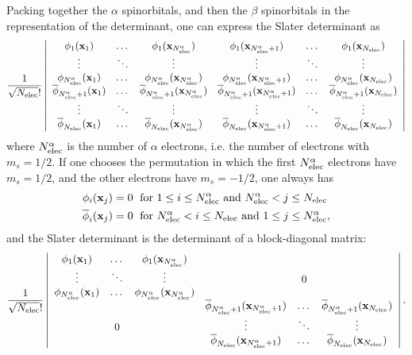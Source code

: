 \documentclass[./thesis.tex]{subfiles}
\begin{document}
Packing together the $\alpha$ spinorbitals, and then the $\beta$ spinorbitals in the representation of
the determinant, one can express the Slater determinant as
\begin{equation}
\frac{1}{\sqrt{{N_\text{elec}}}!} \left|
 \begin{array}{cccccc}
 \phi_1({\bf x}_1)  & \dots & \phi_1({\bf x}_{{N_\text{elec}^\alpha}}) & \phi_1({\bf x}_{{N_\text{elec}^\alpha}+1}) & \dots & \phi_1({\bf x}_{{N_\text{elec}}}) \\
 \vdots             & \ddots& \vdots                    & \vdots                      &\ddots & \vdots  \\         
 \phi_{{N_\text{elec}^\alpha}}({\bf x}_1)  & \dots & \phi_{{N_\text{elec}^\alpha}}({\bf x}_{{N_\text{elec}^\alpha}}) & \phi_{{N_\text{elec}^\alpha}}({\bf x}_{{N_\text{elec}^\alpha}+1}) & \dots & \phi_{{N_\text{elec}^\alpha}}({\bf x}_{{N_\text{elec}}}) \\
 \overline{\phi}_{{N_\text{elec}^\alpha}+1}({\bf x}_1)  & \dots & \overline{\phi}_{{N_\text{elec}^\alpha}+1}({\bf x}_{{N_\text{elec}^\alpha}}) & \overline{\phi}_{{N_\text{elec}^\alpha}+1}({\bf x}_{{N_\text{elec}^\alpha}+1}) & \dots & \overline{\phi}_{{N_\text{elec}^\alpha}+1}({\bf x}_{{N_\text{elec}}}) \\
 \vdots             & \ddots& \vdots                    & \vdots                      &\ddots & \vdots  \\         
 \overline{\phi}_{{N_\text{elec}}}({\bf x}_1)  & \dots & \overline{\phi}_{{N_\text{elec}}}({\bf x}_{{N_\text{elec}^\alpha}}) & \overline{\phi}_{{N_\text{elec}}}({\bf x}_{{N_\text{elec}^\alpha}+1}) & \dots & \overline{\phi}_{{N_\text{elec}}}({\bf x}_{{N_\text{elec}}}) \\
 \end{array}
\right| 
\end{equation}
where ${N_\text{elec}^\alpha}$ is the number of $\alpha$ electrons, i.e. the number of electrons with $m_s=1/2$.
If one chooses the permutation in which the first ${N_\text{elec}^\alpha}$ electrons have $m_s=1/2$, and the other electrons have $m_s=-1/2$, one always has
\begin{align}
\phi_i(\mathbf{x}_j) & = 0 \; \text{ for } 1 \le i \le {N_\text{elec}^\alpha} \text{ and } {N_\text{elec}^\alpha} < j \le {N_\text{elec}} \\ \nonumber
\overline{\phi}_i(\mathbf{x}_j) & = 0 \; \text{ for }  {N_\text{elec}^\alpha} < i \le {N_\text{elec}} \text{ and }  1 \le j \le {N_\text{elec}^\alpha},
\end{align}
and the Slater determinant is the determinant of a block-diagonal matrix:
\begin{equation}
\frac{1}{\sqrt{{N_\text{elec}}}!} \left|
 \begin{array}{cccccc}
 \phi_1({\bf x}_1)  & \dots & \phi_1({\bf x}_{{N_\text{elec}^\alpha}}) &   & &   \\
 \vdots             &\ddots & \vdots                    & &  0    & \\         
 \phi_{{N_\text{elec}^\alpha}}({\bf x}_1)  & \dots & \phi_{{N_\text{elec}^\alpha}}({\bf x}_{{N_\text{elec}^\alpha}}) &   & &   \\
   & & & \overline{\phi}_{{N_\text{elec}^\alpha}+1}({\bf x}_{{N_\text{elec}^\alpha}+1}) & \dots & \overline{\phi}_{{N_\text{elec}^\alpha}+1}({\bf x}_{{N_\text{elec}}}) \\
 & 0 & & \vdots                      &\ddots & \vdots  \\         
   & &   & \overline{\phi}_{{N_\text{elec}}}({\bf x}_{{N_\text{elec}^\alpha}+1}) & \dots & \overline{\phi}_{{N_\text{elec}}}({\bf x}_{{N_\text{elec}}}) \\
 \end{array}
\right|. 
\end{equation}
\end{document}

